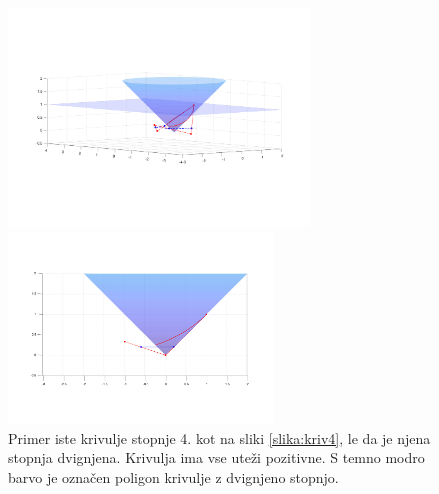 \documentclass[a4paper,11pt]{article}
\theoremstyle{definition}
\theoremstyle{plain}
\begin{document}
\begin{figure}[ht!]
    \begin{minipage}{0.5\textwidth}
        \centering
        \includegraphics[width=80mm]{kriv4_2a.png}
    \end{minipage}\hfill
    \begin{minipage}{0.5\textwidth}
        \centering
        \includegraphics[width=70mm]{kriv4_2c.png}
    \end{minipage}\hfill
    \caption{Primer iste krivulje stopnje 4. kot na sliki \ref{slika:kriv4}, le da je njena stopnja dvignjena. Krivulja ima vse uteži pozitivne. S temno modro barvo je označen poligon krivulje z dvignjeno stopnjo.}
    \label{slika:kriv4a}
\end{figure}
\end{document}
